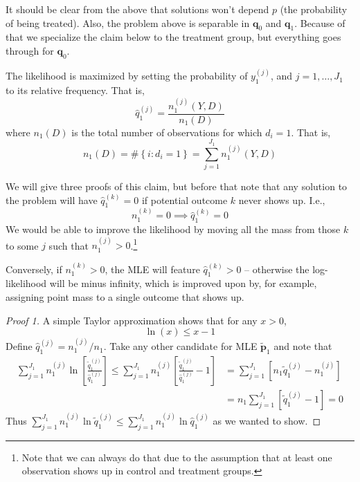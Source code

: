 \documentclass[11pt]{article} %
\begin{document}
It should be clear from the above that solutions won't depend $p$ (the
probability of being treated). Also, the problem above is separable in $\mathbf
q_0$ and $\mathbf q_1$. Because of that we specialize the claim below to the
treatment group, but everything goes through for $\mathbf q_0$.

\begin{claim}\label{cl:mle} The likelihood is maximized by setting the probability of
  $y_1^{(j)}$, and $j=1,\ldots, J_1$ to its relative frequency. That is,
  \[ \hat q_1^{(j)} = \frac{n_1^{(j)}(Y,D)}{n_1(D)}\]
  where $n_1(D)$ is the total number of observations for which $d_i=1$. That is,
  \[ n_1(D) = \# \left\{ i : d_i = 1 \right\} = \sum_{j=1}^{J_1} n_1^{(j)}(Y,D)\]
\end{claim}

We will give three proofs of this claim, but before that note that any solution to the problem will have $\hat
q_1^{(k)} = 0$ if potential outcome $k$ never shows up. I.e.,
\[ n_1^{(k)} = 0 \implies \hat q_1^{(k)} = 0 \]
We would be able to improve the likelihood
by moving all the mass from those $k$ to some $j$ such that $n_1^{(j)}>
0$.\footnote{Note that we can always do that due to the assumption that at least
one observation shows up in control and treatment groups.}

Conversely, if $n_1^{(k)}> 0$, the MLE will feature $\hat q_1^{(k)} > 0$ -- otherwise the
log-likelihood will be minus infinity, which is improved upon by, for example, assigning
point mass to a single outcome that shows up. 

\begin{proof}[Proof 1]
  A simple Taylor approximation shows that for any $x > 0$,
  \begin{equation}
    \label{eq:concavelog}
    \ln(x) \leq x - 1
  \end{equation}
  Define $\hat q_1^{(j)} = n_1^{(j)}/n_1$. Take any other candidate for MLE
  $\tilde {\mathbf p}_1$ and note that
  \[
    \begin{aligned}
      \sum_{j=1}^{J_1} n_1^{(j)} \ln \left[ \frac{\tilde q_1^{(j)}}{\hat
          q_1^{(j)}} \right] \leq \sum_{j=1}^{J_1} n_1^{(j)} \left[ \frac{\tilde
          q_1^{(j)}}{\hat q_1^{(j)}} - 1 \right] & = \sum_{j=1}^{J_1} \left[ n_1
        \tilde q_1^{(j)} - n_1^{(j)} \right] \\
      & = n_1 \sum_{j=1}^{J_1} \left[  \tilde q_1^{(j)} - 1 \right] = 0
    \end{aligned}
  \]
  Thus $\sum_{j=1}^{J_1} n_1^{(j)} \ln \tilde q_1^{(j)} \leq
  \sum_{j=1}^{J_1} n_1^{(j)} \ln \hat q_1^{(j)}$ as we wanted to show.
  
 
\end{proof}
\end{document}
